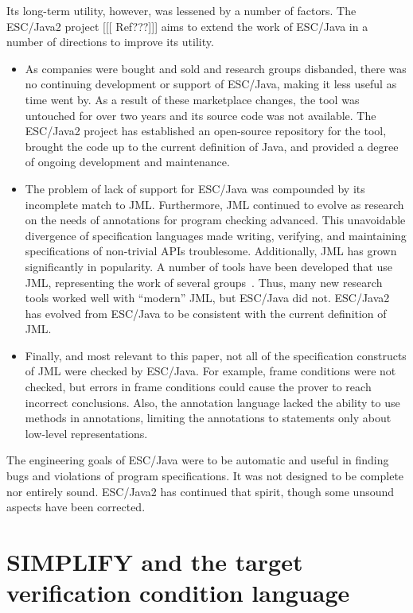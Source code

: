 \documentclass{sig-alternate}
\begin{document}
Its long-term utility, however, was lessened by a number of factors.  
The ESC/Java2 project [[[ Ref???]]] aims to extend the work of ESC/Java 
in a number of directions to improve its utility.
\begin{itemize}
\item As companies were bought and sold and research groups
disbanded, there was no continuing development or support of 
ESC/Java, making it less useful as time went by.  As a result of these
marketplace changes, the tool was untouched for over two years and its
source code was not available.  The ESC/Java2 project has established
an open-source repository for the tool, brought the code up to the current
definition of Java, and provided a degree of ongoing development and
maintenance.
\item The problem of lack of support for ESC/Java was compounded by its
incomplete match to JML.  Furthermore, JML continued to evolve as
research on the needs of annotations for program checking advanced.
This unavoidable divergence of specification languages made writing,
verifying, and maintaining specifications of non-trivial APIs
troublesome.
Additionally, JML has grown significantly in popularity.  A number of
tools have been developed that use JML, representing the work of several
groups~\cite{Burdy-etal03,jmlpapers,Bogor03,NimmerErnst01,Leavens-etal00}.
Thus, many new research tools worked well with ``modern'' JML, but
ESC/Java did not.  ESC/Java2 has evolved from ESC/Java to be
consistent with the current definition of JML.
\item Finally, and most relevant to this paper,
not all of the specification constructs of JML were checked by ESC/Java.  For
example, frame conditions were not checked, but errors in frame
conditions could cause the prover to reach incorrect conclusions.
Also, the annotation language lacked the ability to use methods in
annotations, limiting the annotations to statements only about
low-level representations.
\end{itemize}

The engineering goals of ESC/Java were to be automatic and useful in finding bugs
and violations of program specifications.  It was not designed to be complete nor
entirely sound.  ESC/Java2 has continued that spirit, though some unsound aspects have
been corrected.

\section{SIMPLIFY and the target verification condition language}
\end{document}
